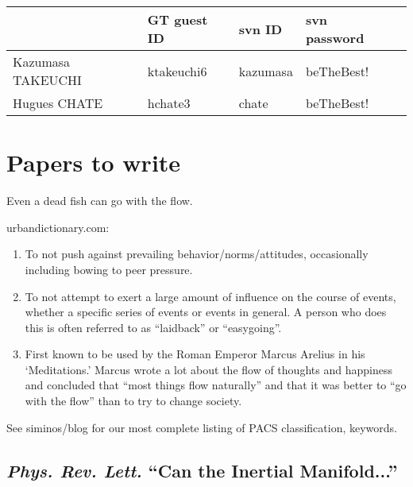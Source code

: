 \begin{tabular}{l|ll|ll} %
                    & GT guest ID & svn ID   & svn password \\  \hline
  Kazumasa TAKEUCHI & ktakeuchi6  & kazumasa & beTheBest! \\
  Hugues   CHATE    & hchate3     & chate    & beTheBest! \\
\end{tabular}

\section{Papers to write}

\begin{bartlett}{
Even a dead fish can go with the flow.}
\end{bartlett}


{urbandictionary.com}:

\begin{enumerate}
   \item To not push against prevailing behavior/norms/attitudes,
   occasionally including bowing to peer pressure.

   \item To not attempt to exert a large amount of influence on the
   course of events, whether a specific series of events or events in
   general. A person who does this is often referred to as ``laidback''
   or ``easygoing''.

   \item First known to be used by the Roman Emperor Marcus Arelius in
   his `Meditations.' Marcus wrote a lot about the flow of
   thoughts and happiness and concluded that ``most things flow
   naturally'' and that it was better to ``go with the flow''
   than to try to change society.
 \end{enumerate}

See siminos/blog for our most complete listing of
PACS classification, keywords.

\subsection{\emph{Phys. Rev. Lett.} ``Can the Inertial Manifold...''}

